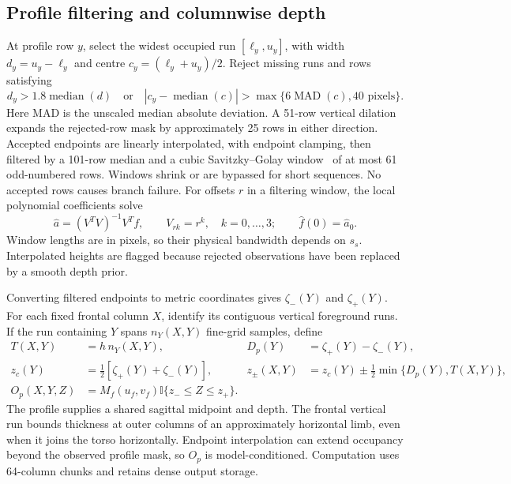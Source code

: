 \documentclass[11pt,a4paper]{article}
\newcommand{\indic}{\mathbb I}
\begin{document}
\subsection{Profile filtering and columnwise depth}
At profile row $y$, select the widest occupied run $[\ell_y,u_y]$, with width $d_y=u_y-\ell_y$ and centre $c_y=(\ell_y+u_y)/2$. Reject missing runs and rows satisfying
\begin{equation}
 d_y>1.8\operatorname{median}(d)\quad\text{or}\quad
 |c_y-\operatorname{median}(c)|>
 \max\{6\operatorname{MAD}(c),40\text{ pixels}\}.
\end{equation}
Here MAD is the unscaled median absolute deviation. A 51-row vertical dilation expands the rejected-row mask by approximately 25 rows in either direction. Accepted endpoints are linearly interpolated, with endpoint clamping, then filtered by a 101-row median and a cubic Savitzky--Golay window~\cite{savitzky1964smoothing} of at most 61 odd-numbered rows. Windows shrink or are bypassed for short sequences. No accepted rows causes branch failure. For offsets $r$ in a filtering window, the local polynomial coefficients solve
\begin{equation}
 \hat a=(V^TV)^{-1}V^Tf,\qquad V_{rk}=r^k,\quad k=0,\ldots,3;
 \qquad \hat f(0)=\hat a_0.
\end{equation}
Window lengths are in pixels, so their physical bandwidth depends on $s_s$. Interpolated heights are flagged because rejected observations have been replaced by a smooth depth prior.

Converting filtered endpoints to metric coordinates gives $\zeta_-(Y)$ and $\zeta_+(Y)$. For each fixed frontal column $X$, identify its contiguous vertical foreground runs. If the run containing $Y$ spans $n_Y(X,Y)$ fine-grid samples, define
\begin{equation}
 \begin{aligned}
 T(X,Y)&=h\,n_Y(X,Y),&
 D_p(Y)&=\zeta_+(Y)-\zeta_-(Y),\\
 z_c(Y)&=\tfrac12[\zeta_+(Y)+\zeta_-(Y)],&
 z_\pm(X,Y)&=z_c(Y)\pm\tfrac12\min\{D_p(Y),T(X,Y)\},\\
 O_p(X,Y,Z)&=M_f(u_f,v_f)\indic\{z_-\leq Z\leq z_+\}.&&
 \end{aligned}
 \label{eq:profile}
\end{equation}
The profile supplies a shared sagittal midpoint and depth. The frontal vertical run bounds thickness at outer columns of an approximately horizontal limb, even when it joins the torso horizontally. Endpoint interpolation can extend occupancy beyond the observed profile mask, so $O_p$ is model-conditioned. Computation uses 64-column chunks and retains dense output storage.
\end{document}
